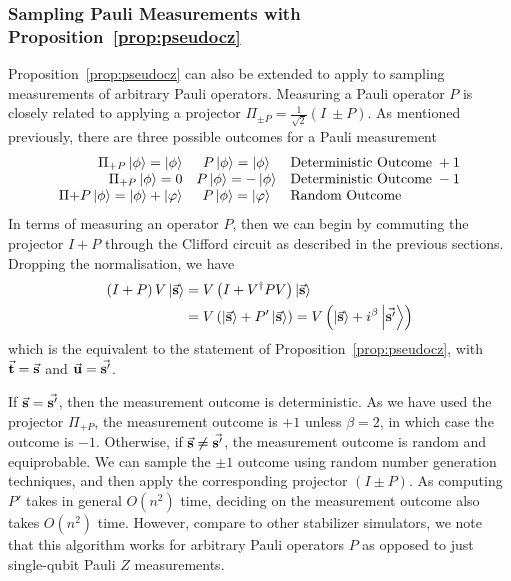 \subsubsection*{Sampling Pauli Measurements with Proposition~\ref{prop:pseudocz}}
Proposition~\ref{prop:pseudocz} can also be extended to apply to sampling measurements of arbitrary Pauli operators. Measuring a Pauli operator $P$ is closely related to applying a projector $\Pi_{\pm P}=\frac{1}{\sqrt{2}}\left(I\ \pm P\right)$. As mentioned previously, there are three possible outcomes for a Pauli measurement
\[
\begin{array}{r c l}
\Pi_{+P}\ket{\phi} = \ket{\phi} & P\ket{\phi} = \ket{\phi} & \text{Deterministic Outcome}\;+1\\
\Pi_{+P}\ket{\phi} = 0 & P\ket{\phi} = -\ket{\phi} & \text{Deterministic Outcome}\; -1\\
\Pi{+P}\ket{\phi} = \ket{\phi}+\ket{\varphi} & P\ket{\phi}=\ket{\varphi} & \text{Random Outcome} \\
\end{array}
\]
In terms of measuring an operator $P$, then we can begin by commuting the projector $I+P$ through the Clifford circuit as described in the previous sections. Dropping the normalisation, we have
\begin{align*}
\left(I+P\right)V\ket{\va{s}} &= V\left(I+V^{\dagger}PV\right)\ket{\va{s}} \\
& = V\left(\ket{\va{s}}+P'\ket{\va{s}}\right) = V\left(\ket{\va{s}}+i^{\beta}\ket{\va{s'}}\right)
\end{align*}
which is the equivalent to the statement of Proposition~\ref{prop:pseudocz}, with $\va{t}=\va{s}$ and $\va{u}=\va{s'}$.\par
If $\va{s}=\va{s'}$, then the measurement outcome is deterministic. As we have used the projector $\Pi_{+P}$, the measurement outcome is $+1$ unless $\beta=2$, in which case the outcome is $-1$. Otherwise, if $\va{s}\neq \va{s'}$, the measurement outcome is random and equiprobable. We can sample the $\pm 1$ outcome using random number generation techniques, and then apply the corresponding projector $\left(I\pm P\right)$. As computing $P'$ takes in general $O(n^{2})$ time, deciding on the measurement outcome also takes $O(n^{2})$ time. However, compare to other stabilizer simulators, we note that this algorithm works for arbitrary Pauli operators $P$ as opposed to just single-qubit Pauli $Z$ measurements.
